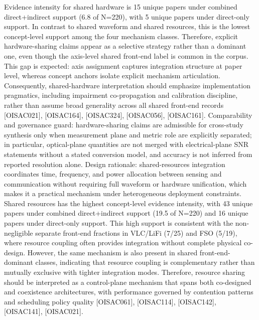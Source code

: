 {}Evidence intensity for shared hardware is 15 unique papers under combined direct+indirect support (6.8\markdownRendererPercentSign{} of N=220), with 5 unique papers under direct-only support. In contrast to shared waveform and shared resources, this is the lowest concept-level support among the four mechanism classes. Therefore, explicit hardware-sharing claims appear as a selective strategy rather than a dominant one, even though the axis-level shared front-end label is common in the corpus. This gap is expected: axis assignment captures integration structure at paper level, whereas concept anchors isolate explicit mechanism articulation. Consequently, shared-hardware interpretation should emphasize implementation pragmatics, including impairment co-propagation and calibration discipline, rather than assume broad generality across all shared front-end records [O\markdownRendererUnderscore{}ISAC\markdownRendererUnderscore{}021], [O\markdownRendererUnderscore{}ISAC\markdownRendererUnderscore{}164], [O\markdownRendererUnderscore{}ISAC\markdownRendererUnderscore{}324], [O\markdownRendererUnderscore{}ISAC\markdownRendererUnderscore{}056], [O\markdownRendererUnderscore{}ISAC\markdownRendererUnderscore{}161].\markdownRendererParagraphSeparator
{}Comparability and governance guard: hardware-sharing claims are admissible for cross-study synthesis only when measurement plane and metric role are explicitly separated; in particular, optical-plane quantities are not merged with electrical-plane SNR statements without a stated conversion model, and accuracy is not inferred from reported resolution alone.\markdownRendererInterblockSeparator
{}
\markdownRendererSectionEnd \markdownRendererSectionBegin
{}\markdownRendererInterblockSeparator
{}Design rationale: shared-resources integration coordinates time, frequency, and power allocation between sensing and communication without requiring full waveform or hardware unification, which makes it a practical mechanism under heterogeneous deployment constraints.\markdownRendererParagraphSeparator
{}Shared resources has the highest concept-level evidence intensity, with 43 unique papers under combined direct+indirect support (19.5\markdownRendererPercentSign{} of N=220) and 16 unique papers under direct-only support. This high support is consistent with the non-negligible separate front-end fractions in VLC/LiFi (7/25) and FSO (5/19), where resource coupling often provides integration without complete physical co-design. However, the same mechanism is also present in shared front-end-dominant classes, indicating that resource coupling is complementary rather than mutually exclusive with tighter integration modes. Therefore, resource sharing should be interpreted as a control-plane mechanism that spans both co-designed and coexistence architectures, with performance governed by contention patterns and scheduling policy quality [O\markdownRendererUnderscore{}ISAC\markdownRendererUnderscore{}061], [O\markdownRendererUnderscore{}ISAC\markdownRendererUnderscore{}114], [O\markdownRendererUnderscore{}ISAC\markdownRendererUnderscore{}142], [O\markdownRendererUnderscore{}ISAC\markdownRendererUnderscore{}141], [O\markdownRendererUnderscore{}ISAC\markdownRendererUnderscore{}021].\markdownRendererParagraphSeparator
